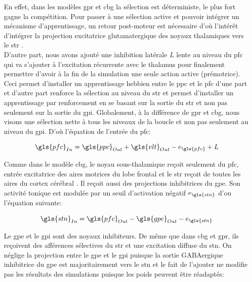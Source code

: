En effet, dans les modèles \gls{gpr} et \gls{cbg} la sélection est déterministe, le plus fort gagne la compétition. Pour passer à une sélection active et pouvoir intégrer un mécanisme d'apprentissage, un retour post-moteur est nécessaire d'où l'intérêt d'intégrer la projection excitatrice glutamatergique des noyaux thalamiques vers le \gls{str} \cite{Lapper:1992, Sadikot:1992}.\\

D'autre part, nous avons ajouté une inhibition latérale $L$ lente au niveau du \gls{pfc} qui va s'ajouter à l'excitation récurrente avec le thalamus pour finalement permettre d'avoir à la fin de la simulation une seule action active (prémotrice). Ceci permet d'installer un apprentissage hebbien entre le \gls{ppc} et le \gls{pfc} d'une part et d'autre part renforce la sélection au niveau du \gls{str} et permet d'installer un apprentissage par renforcement en se basant sur la sortie du \gls{str} et non pas seulement sur la sortie du \gls{gpi}. Globalement, à la différence de \gls{gpr} et \gls{cbg}, nous visons une sélection nette à tous les niveaux de la boucle et non pas seulement au niveau du \gls{gpi}. D'où l'équation de l'entrée du \gls{pfc}:

\begin{center}
\begin{equation} 
{\gls{pfc}}_{In}= {\gls{ppc}}_{Out}+{\gls{vlt}}_{Out}-e_{\gls{pfc}}+L
 \end{equation}
\end{center}

Comme dans le modèle \gls{cbg}, le noyau sous-thalamique reçoit seulement du \gls{pfc}, entrée excitatrice des aires motrices du lobe frontal \cite{Mink:1996} et le \gls{str} reçoit de toutes les aires du cortex cérébral \cite{Cherubini:1988, Kemp:1970}. Il reçoit aussi des projections inhibitrices du \gls{gpe}. Son activité tonique est modulée par un seuil d'activation négatif $e_{\gls{stn}}$ d'ou l'équation suivante:

\begin{center}
\begin{equation} 
{\gls{stn}}_{In}= {\gls{pfc}}_{Out}-{\gls{gpe}}_{Out}-e_{\gls{stn}}
 \end{equation}
\end{center}

Le \gls{gpe} et le \gls{gpi} sont des noyaux inhibiteurs. De même que dans \gls{cbg} et \gls{gpr}, ils reçoivent des afférences sélectives du \gls{str} et une
excitation diffuse du \gls{stn}. On néglige la projection entre le \gls{gpe} et le \gls{gpi} puisque la sortie GABAergique inhibitrice du \gls{gpe} est majoritairement vers le \gls{stn} \cite{Rouzaire:1980} et le fait de l'ajouter ne modifie pas les résultats des simulations puisque les poids peuvent être réadaptés: 

